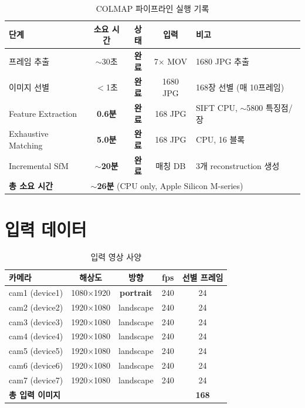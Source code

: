 \documentclass[11pt, a4paper]{report}
\begin{document}
\begin{table}[H]
\centering
\caption{COLMAP 파이프라인 실행 기록}
\renewcommand{\arraystretch}{1.3}
\begin{tabular}{lcccl}
\toprule
\textbf{단계} & \textbf{소요 시간} & \textbf{상태} & \textbf{입력} & \textbf{비고} \\
\midrule
프레임 추출 & $\sim$30초 & \textcolor{thmgreen}{\textbf{완료}} & 7$\times$ MOV & 1680 JPG 추출 \\
이미지 선별 & $<$1초 & \textcolor{thmgreen}{\textbf{완료}} & 1680 JPG & 168장 선별 (매 10프레임) \\
Feature Extraction & \textbf{0.6분} & \textcolor{thmgreen}{\textbf{완료}} & 168 JPG & SIFT CPU, $\sim$5800 특징점/장 \\
Exhaustive Matching & \textbf{5.0분} & \textcolor{thmgreen}{\textbf{완료}} & 168 JPG & CPU, 16 블록 \\
Incremental SfM & \textbf{$\sim$20분} & \textcolor{thmgreen}{\textbf{완료}} & 매칭 DB & 3개 reconstruction 생성 \\
\midrule
\textbf{총 소요 시간} & \multicolumn{4}{l}{\textbf{$\sim$26분} (CPU only, Apple Silicon M-series)} \\
\bottomrule
\end{tabular}
\end{table}


\section{입력 데이터}

\begin{table}[H]
\centering
\caption{입력 영상 사양}
\renewcommand{\arraystretch}{1.3}
\begin{tabular}{lcccc}
\toprule
\textbf{카메라} & \textbf{해상도} & \textbf{방향} & \textbf{fps} & \textbf{선별 프레임} \\
\midrule
cam1 (device1) & 1080$\times$1920 & \textbf{portrait} & 240 & 24 \\
cam2 (device2) & 1920$\times$1080 & landscape & 240 & 24 \\
cam3 (device3) & 1920$\times$1080 & landscape & 240 & 24 \\
cam4 (device4) & 1920$\times$1080 & landscape & 240 & 24 \\
cam5 (device5) & 1920$\times$1080 & landscape & 240 & 24 \\
cam6 (device6) & 1920$\times$1080 & landscape & 240 & 24 \\
cam7 (device7) & 1920$\times$1080 & landscape & 240 & 24 \\
\midrule
\multicolumn{4}{l}{\textbf{총 입력 이미지}} & \textbf{168} \\
\bottomrule
\end{tabular}
\end{table}
\end{document}
